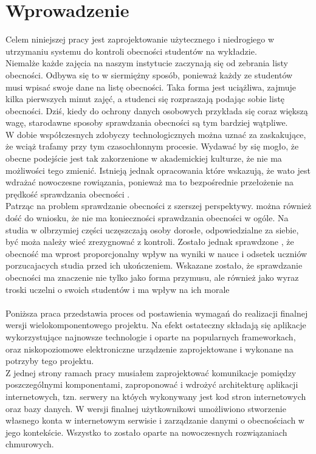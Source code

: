 \documentclass[declaration,shortabstract, mgr]{iithesis}
\author {Dawid Szczyrk}
\begin{document}
\chapter{Wprowadzenie}

Celem niniejszej pracy jest zaprojektowanie użytecznego i niedrogiego w utrzymaniu systemu do kontroli obecności studentów na wykładzie.\\
\indent Niemalże każde zajęcia na naszym instytucie zaczynają się od zebrania listy obecności. Odbywa się to w siermiężny sposób, ponieważ każdy ze studentów musi wpisać swoje dane na listę obecności.
Taka forma jest uciążliwa, zajmuje kilka pierwszych minut zajęć, a studenci się rozpraszają podając sobie listę obecności. Dziś, kiedy do ochrony danych osobowych przykłada się
coraz większą wagę, starodawne sposoby sprawdzania obecności są tym bardziej wątpliwe.\\
\indent W dobie współczesnych zdobyczy technologicznych można uznać za zaskakujące, że wciąż trafamy przy tym czasochłonnym procesie. Wydawać by się mogło, że obecne podejście jest tak zakorzenione w akademickiej kulturze, że nie ma możliwości tego zmienić. Istnieją jednak opracowania które wskazują, że wato jest wdrażać nowoczesne rowiązania, ponieważ ma to bezpośrednie przełożenie na prędkość sprawdzania obecności \cite{lcd}.\\
\indent Patrząc na problem sprawdzanie obecności z szerszej perspektywy. można również dość do wniosku, że nie ma konieczności sprawdzania obecności w ogóle. Na studia w olbrzymiej części uczęszczają osoby dorosłe, odpowiedzialne za siebie, być moża należy wieć zrezygnować z kontroli. Zostało jednak sprawdzone \cite{theory_base}, że obecność ma wprost proporcjonalny wpływ na wyniki w nauce i odsetek uczniów porzucajacych studia przed ich ukończeniem. Wskazane zostało, że sprawdzanie obecności ma znaczenie nie tylko jako forma przymusu, ale również jako wyraz troski uczelni o swoich studentów i ma wpływ na ich morale\\\\
\indent Poniższa praca przedstawia proces od postawienia wymagań do realizacji finalnej wersji wielokomponentowego projektu. Na efekt ostateczny składają się aplikacje wykorzystujące najnowsze technologie i oparte na popularnych frameworkach, oraz niskopoziomowe elektroniczne urządzenie zaprojektowane i wykonane na potrzyby tego projektu.\\
\indent Z jednej strony ramach pracy musiałem zaprojektować komunikacje pomiędzy poszczególnymi komponentami, zaproponować i wdrożyć architekturę aplikacji internetowych, tzn. serwery na któych wykonywany jest kod stron internetowych oraz bazy danych. W wersji finalnej użytkownikowi umożliwiono stworzenie własnego konta w internetowym serwisie i zarządzanie danymi o obecnościach w jego kontekście. Wszystko to zostało oparte na nowoczesnych rozwiązaniach chmurowych. \\
\end{document}
